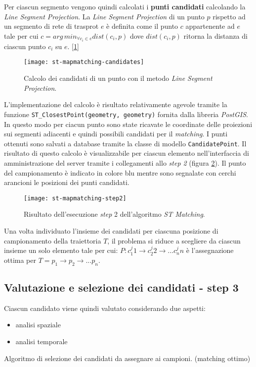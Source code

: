 Per ciascun segmento vengono quindi calcolati i \textbf{punti candidati} calcolando la \emph{Line Segment Projection}. La \emph{Line Segment Projection} di un punto $p$ rispetto ad un segmento di rete di trasprot $e$ è definita come il punto $c$ appartenente ad $e$ tale per cui $c=arg\, min_{\forall c_i \in e} dist(c_i, p)$ dove $dist(c_i, p)$ ritorna la distanza di ciascun punto $c_i$ su $e$. [\ref{fig:st-mapmatching-candidates}]

\begin{figure}[h]
  \centering
  \texttt{[image: st-mapmatching-candidates]}
  \caption{\footnotesize{Calcolo dei candidati di un punto con il metodo \emph{Line Segment Projection}.}}
  \label{fig:st-mapmatching-candidates}
\end{figure}

L'implementazione del calcolo è risultato relativamente agevole tramite la funzione \texttt{ST\_ClosestPoint(geometry, geometry)} fornita dalla libreria \emph{PostGIS}. In questo modo per ciacun punto sono state ricavate le coordinate delle proiezioni sui segmenti adiacenti e quindi possibili candidati per il \emph{matching}. I punti ottenuti sono salvati a database tramite la classe di modello \texttt{CandidatePoint}. Il risultato di questo calcolo è visualizzabile per ciascun elemento nell'interfaccia di amministrazione del server tramite i collegamenti allo \emph{step 2} (figura \ref{fig:st-mapmatching-step2}). Il punto del campionamento è indicato in colore blu mentre sono segnalate con cerchi arancioni le posizioni dei punti candidati.

\begin{figure}[h]
  \centering
  \texttt{[image: st-mapmatching-step2]}
  \caption{\footnotesize{Risultato dell'esecuzione \emph{step} 2 dell'algoritmo \emph{ST Matching}.}}
  \label{fig:st-mapmatching-step2}
\end{figure}

Una volta individuato l'insieme dei candidati per ciascuna posizione di campionamento della traiettoria $T$, il problema si riduce a scegliere da ciascun insieme un solo elemento tale per cui: $P: c_1^j1 \rightarrow c_2^j2 \rightarrow ... c_n^jn$ è l'assegnazione ottima per $T=p_1 \rightarrow p_2 \rightarrow ... p_n$.

\subsection{Valutazione e selezione dei candidati - step 3}
Ciascun candidato viene quindi valutato considerando due aspetti:
\begin{itemize}
  \item analisi spaziale
  \item analisi temporale
\end{itemize}


Algoritmo di selezione dei candidati da assegnare ai campioni. (matching ottimo) 
